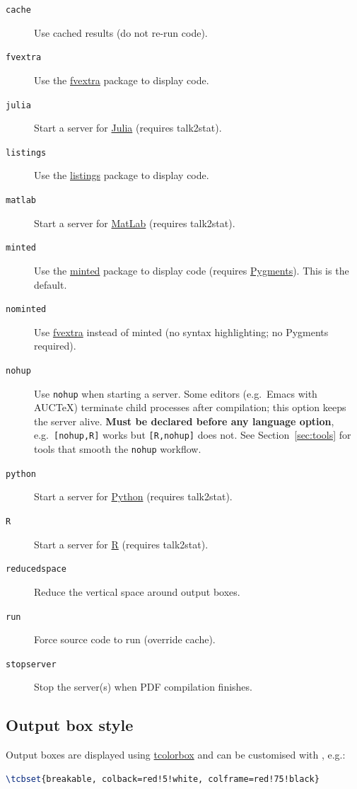 \documentclass{ltxdoc}
\newcommand{\pkg}[1]{\textsf{#1}}
\newcommand{\opt}[1]{\texttt{#1}}
\begin{document}
\begin{description}
  \item[\opt{cache}] Use cached results (do not re-run code).
  \item[\opt{fvextra}] Use the \href{https://ctan.org/pkg/fvextra}{fvextra}
    package to display code.
  \item[\opt{julia}] Start a server for
    \href{https://julialang.org/}{Julia} (requires \pkg{talk2stat}).
  \item[\opt{listings}] Use the
    \href{https://ctan.org/pkg/listings}{listings} package to display code.
  \item[\opt{matlab}] Start a server for
    \href{https://www.mathworks.com/products/matlab.html}{MatLab}
    (requires \pkg{talk2stat}).
  \item[\opt{minted}] Use the
    \href{https://ctan.org/pkg/minted}{minted} package to display code
    (requires \href{https://pygments.org/}{Pygments}).
    This is the default.
  \item[\opt{nominted}] Use \href{https://ctan.org/pkg/fvextra}{fvextra}
    instead of \pkg{minted} (no syntax highlighting; no Pygments required).
  \item[\opt{nohup}] Use \texttt{nohup} when starting a server.
    Some editors (e.g.\ Emacs with AUCTeX) terminate child processes after
    compilation; this option keeps the server alive.
    \textbf{Must be declared before any language option}, e.g.\
    \opt{[nohup,R]} works but \opt{[R,nohup]} does not.
    See Section~\ref{sec:tools} for tools that smooth the \opt{nohup}
    workflow.
  \item[\opt{python}] Start a server for
    \href{https://www.python.org/}{Python} (requires \pkg{talk2stat}).
  \item[\opt{R}] Start a server for \href{https://www.r-project.org/}{R}
    (requires \pkg{talk2stat}).
  \item[\opt{reducedspace}] Reduce the vertical space around output boxes.
  \item[\opt{run}] Force source code to run (override cache).
  \item[\opt{stopserver}] Stop the server(s) when PDF compilation finishes.
\end{description}

\subsection{Output box style}

Output boxes are displayed using
\href{https://ctan.org/pkg/tcolorbox}{tcolorbox} and can be customised
with \cs{tcbset}, e.g.:
\begin{lstlisting}[language=tex]
\tcbset{breakable, colback=red!5!white, colframe=red!75!black}
\end{lstlisting}
\end{document}
